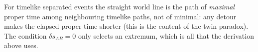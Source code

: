 \begin{remark}
    For timelike separated events the straight world line is the path of \emph{maximal} proper
    time among neighbouring timelike paths, not of minimal: any detour makes the elapsed proper
    time shorter (this is the content of the twin paradox). The condition $\delta s_{AB} = 0$
    only selects an extremum, which is all that the derivation above uses.
\end{remark}
